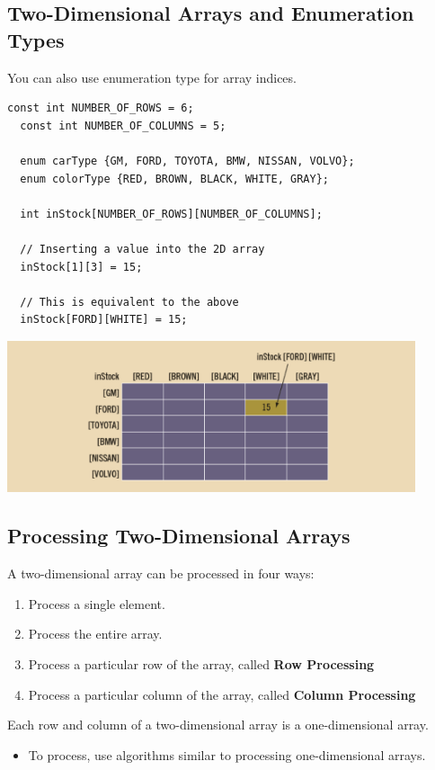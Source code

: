 \documentclass{article}
\begin{document}
\subsection{Two-Dimensional Arrays and Enumeration Types}
You can also use enumeration type for array indices.

\begin{lstlisting}[caption={Enumeration Type in Two-Dimensional Arrays Example}]
  const int NUMBER_OF_ROWS = 6;
  const int NUMBER_OF_COLUMNS = 5;

  enum carType {GM, FORD, TOYOTA, BMW, NISSAN, VOLVO};
  enum colorType {RED, BROWN, BLACK, WHITE, GRAY};

  int inStock[NUMBER_OF_ROWS][NUMBER_OF_COLUMNS];

  // Inserting a value into the 2D array
  inStock[1][3] = 15;

  // This is equivalent to the above
  inStock[FORD][WHITE] = 15;
\end{lstlisting}

\begin{center}
    \includegraphics[width=0.9\textwidth]{2D-arr-inStock-ex.png}
\end{center}

\subsection{Processing Two-Dimensional Arrays}
A two-dimensional array can be processed in four ways:
\begin{enumerate}
  \item Process a single element.
  \item Process the entire array.
  \item Process a particular row of the array, called \textbf{Row 
    Processing}
  \item Process a particular column of the array, called \textbf{Column
    Processing}
\end{enumerate}

Each row and column of a two-dimensional array is a one-dimensional array.
\begin{itemize}
  \item To process, use algorithms similar to processing one-dimensional arrays.
\end{itemize}
\end{document}
